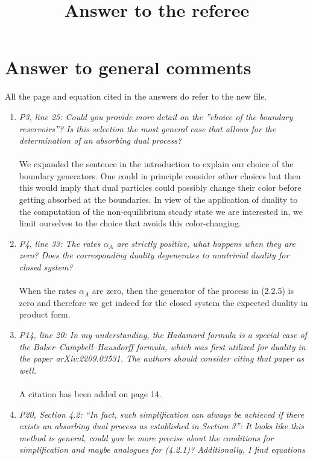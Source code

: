 \documentclass[10pt]{article}
\title{Answer to the referee
}
\numberwithin{equation}{section}
\numberwithin{equation}{subsection}
\begin{document}
		
		\section*{Answer to general comments}
		All the page and equation cited in the answers do refer to the new file. 
		\begin{enumerate}
			\item \textit{P3, line 25: Could you provide more detail on the ”choice of the boundary reservoirs”? Is this selection
				the most general case that allows for the determination of an absorbing dual process?}\\ \\
				We expanded the sentence in the introduction to explain our choice of the boundary generators. One could in principle consider other choices but then this would imply that dual particles could possibly change their color before getting absorbed at the boundaries. In view of the application of duality to the computation of the non-equilibrium steady state we are interested in, we limit ourselves to the choice that avoids this color-changing.
				\item \textit{P4, line 33: The rates $\alpha_{A}$ are strictly positive, what happens when they are zero? Does the corresponding duality degenerates to nontrivial duality for closed system?} \\ \\
					When the rates $\alpha_{A}$ are zero, then the generator of the process in (2.2.5) is zero and therefore we get indeed for the closed system the expected duality in product form.
					\item \textit{P14, line 20: In my understanding, the Hadamard formula is a special case of the Baker–Campbell–Hausdorff
						formula, which was first utilized for duality in the paper arXiv:2209.03531. The authors should consider
						citing that paper as well.}\\ \\
						A citation has been added on page 14.
						\item \textit{P20, Section 4.2: “In fact, such simplification can always be achieved if there exists an absorbing dual
							process as established in Section 3”: It looks like this method is general, could you be more precise
							about the conditions for simplification and maybe analogues for (4.2.1)? Additionally, I find equations
}
\end{enumerate}
\end{document}
